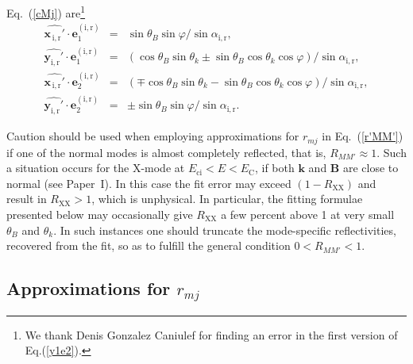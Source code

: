 \documentclass{aa}
\newcommand{\bea}{\begin{eqnarray}}
\newcommand{\eea}{\end{eqnarray}}
\newcommand{\req}[1]{Eq.~(\ref{#1})}
\newcommand{\EC}{E_\mathrm{C}}
\newcommand{\Eci}{E_\mathrm{ci}}
\begin{document}
\req{cMj} are\footnote{We thank Denis Gonzalez Caniulef for finding an
error in the first version of Eq.(\ref{y1e2}).}
\bea
   \hat{\mathbf{x_{\,\mathrm{i,r}}'}}\cdot\bm{e}_1^\mathrm{(i,r)}
     &=&
      \sin\theta_B\sin\varphi/\!\sin\alpha_\mathrm{i,r},
\\
   \hat{\mathbf{y_{\mathrm{i,r}}'}}\cdot\bm{e}_1^\mathrm{(i,r)} &=&
      (\cos\theta_B\sin\theta_k \pm
      \sin\theta_B\cos\theta_k\cos\varphi)/\!\sin\alpha_\mathrm{i,r},
\\
   \hat{\mathbf{x_{\,\mathrm{i,r}}'}}\cdot\bm{e}_2^\mathrm{(i,r)} &=&
      (\mp\cos\theta_B\sin\theta_k -
      \sin\theta_B\cos\theta_k\cos\varphi) /
        \!\sin\alpha_\mathrm{i,r},
\\
   \hat{\mathbf{y_{\mathrm{i,r}}'}}\cdot\bm{e}_2^\mathrm{(i,r)} &=&
     \pm \sin\theta_B\sin\varphi / \sin\alpha_\mathrm{i,r}.
\label{y1e2}
\eea

Caution should be used when employing approximations for
$r_{mj}$ in \req{r'MM'} if one of the normal
modes is almost completely reflected, that is, $R_{MM'}\approx1$.
Such a situation occurs for the X-mode at $\Eci<E<\EC$, if
both $\bm{k}$ and $\bm{B}$ are close to normal (see
Paper~I). In this case the fit error may exceed
$(1-R_\mathrm{XX})$ and result in $R_\mathrm{XX}>1$, which
is unphysical. In particular, the fitting formulae presented
below may occasionally give $R_\mathrm{XX}$ a few percent
above 1 at very small $\theta_B$ and $\theta_k$. In such
instances one should truncate the mode-specific
reflectivities, recovered from the fit, so as to fulfill the
general condition $0<R_{MM'}<1$. 

\subsection{Approximations for $r_{mj}$}
\end{document}
